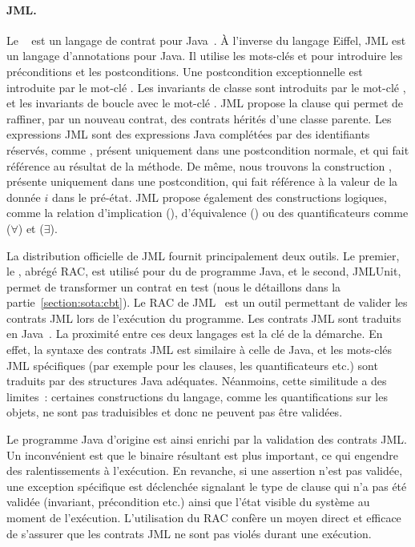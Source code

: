 \paragraph{JML.} Le ~ est un
langage de contrat pour Java~. À l'inverse du langage Eiffel, JML
est un langage d'annotations pour Java. Il utilise les mots-clés 
et  pour introduire les préconditions et les postconditions. Une
postcondition exceptionnelle est introduite par le mot-clé . Les
invariants de classe sont introduits par le mot-clé , et les
invariants de boucle avec le mot-clé . JML propose la
clause  qui permet de raffiner, par un nouveau contrat, des contrats
hérités d'une classe parente. Les expressions JML sont des expressions Java
complétées par des identifiants réservés, comme \aresult, présent uniquement
dans une postcondition normale, et qui fait référence au résultat de la méthode.
De même, nous trouvons la construction , présente uniquement dans une
postcondition, qui fait référence à la valeur de la donnée $i$ dans le pré-état.
JML propose également des constructions logiques, comme la relation
d'implication (\code{==>}), d'équivalence (\code{<==>}) ou des quantificateurs
comme  ($\forall$) et  ($\exists$).

La distribution officielle de JML fournit principalement deux outils.  Le
premier, le , abrégé RAC, est utilisé pour
du  de programme Java, et le second, JMLUnit, permet de
transformer un contrat en test (nous le détaillons dans la
partie~\ref{section:sota:cbt}). Le RAC de JML~ est un outil
permettant de valider les contrats JML lors de l'exécution du programme. Les
contrats JML sont traduits en Java~. La proximité entre ces
deux langages est la clé de la démarche. En effet, la syntaxe des contrats JML
est similaire à celle de Java, et les mots-clés JML spécifiques (par exemple
pour les clauses, les quantificateurs etc.) sont traduits par des structures
Java adéquates.  Néanmoins, cette similitude a des limites~: certaines
constructions du langage, comme les quantifications sur les objets, ne sont pas
traduisibles et donc ne peuvent pas être validées.

Le programme Java d'origine est ainsi enrichi par la validation des contrats
JML. Un inconvénient est que le binaire résultant est plus important, ce qui
engendre des ralentissements à l'exécution. En revanche, si une assertion n'est
pas validée, une exception spécifique est déclenchée signalant le type de clause
qui n'a pas été validée (invariant, précondition etc.) ainsi que l'état visible
du système au moment de l'exécution. L'utilisation du RAC confère un moyen
direct et efficace de s'assurer que les contrats JML ne sont pas violés durant
une exécution.

